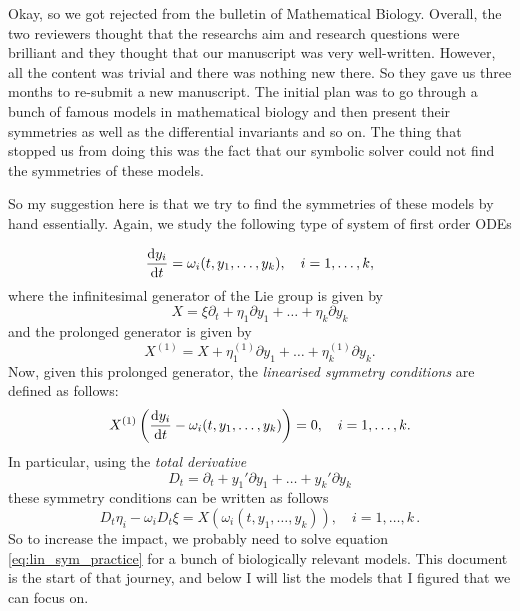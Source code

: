 

Okay, so we got rejected from the bulletin of Mathematical Biology. Overall, the two reviewers thought that the researchs aim and research questions were brilliant and they thought that our manuscript was very well-written. However, all the content was trivial and there was nothing new there. So they gave us three months to re-submit a new manuscript. The initial plan was to go through a bunch of famous models in mathematical biology and then present their symmetries as well as the differential invariants and so on. The thing that stopped us from doing this was the fact that our symbolic solver could not find the symmetries of these models.

So my suggestion here is that we try to find the symmetries of these models by hand essentially. Again, we study the following type of system of first order ODEs

\begin{equation}
\dv{y_i}{t} = \omega_i(t,y_1,\ldots,y_k), \quad i=1,\ldots,k,
  \label{eq:sys_ODE}
\end{equation}
where the infinitesimal generator of the Lie group is given by
\begin{equation}
  X=\xi\partial_t+\eta_{1}\partial{y_1}+\ldots+\eta_{k}\partial{y_k}
  \label{eq:generator}
\end{equation}
and the prolonged generator is given by
\begin{equation}
  X^{(1)}=X+\eta_{1}^{(1)}\partial{y_1}+\ldots+\eta_{k}^{(1)}\partial{y_k}.
  \label{eq:prolonged}
\end{equation}
Now, given this prolonged generator, the \textit{linearised symmetry conditions} are defined as follows:
\begin{equation}
X^{(1)} \left( \dv{y_i}{t} - \omega_i(t,y_1,\ldots,y_k) \right) = 0 , \quad i=1,\ldots,k.
\end{equation}
In particular, using the \textit{total derivative}
\begin{equation}
D_t=\partial_t+y_1'\partial{y_1}+\ldots+y_k'\partial{y_k}
  \label{eq:tot_der}
  \end{equation}
these symmetry conditions can be written as follows
\begin{equation}
\label{eq:lin_sym_practice}
D_t\eta_i-\omega_i D_t\xi=X\left(\omega_i(t,y_1,\ldots,y_k)\right),\quad i=1,\ldots,k \,.
\end{equation}
So to increase the impact, we probably need to solve equation \eqref{eq:lin_sym_practice} for a bunch of biologically relevant models. This document is the start of that journey, and below I will list the models that I figured that we can focus on.

